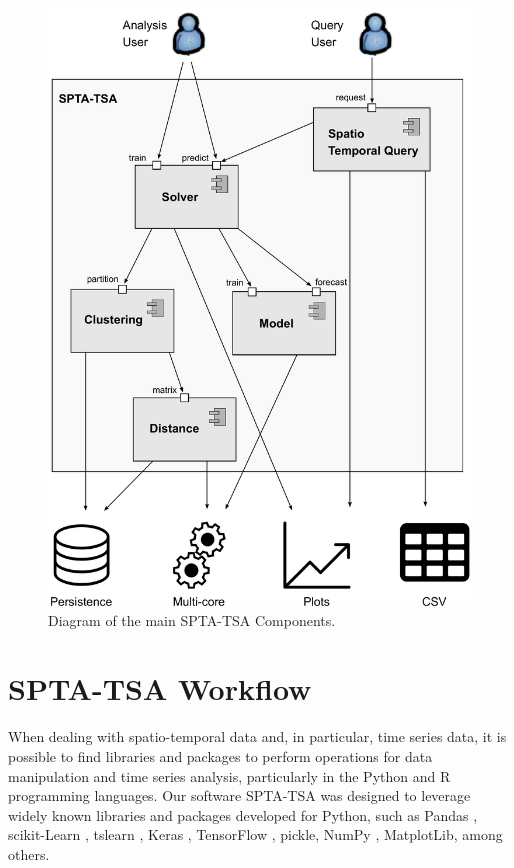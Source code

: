 \begin{figure}[h]
	\centering
	\includegraphics[scale=0.32]{../Figures/arch_spta}
	\caption{Diagram of the main SPTA-TSA Components.}
	\label{Fig:architecture_spta_tsa}
\end{figure}


\section{SPTA-TSA Workflow}
\label{Sec:SPTA-TSA_Workflow}

When dealing with spatio-temporal data and, in particular, time series data, it is possible to find libraries and packages to perform operations for data manipulation and time series analysis, particularly in the Python and R programming languages. Our software SPTA-TSA was designed to leverage widely known libraries and packages developed for Python, such as Pandas \cite{McKinney2010}, scikit-Learn \cite{scikit-learn2011}, tslearn \cite{tslearn2020}, Keras \cite{Chollet2015}, TensorFlow \cite{tensorflow2016}, pickle, NumPy \cite{Harris2020}, MatplotLib, among others.

